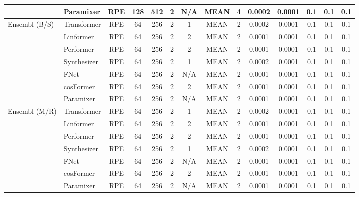 \begin{table}[!h]
{\begin{tabular}{llcccccccccccc}
                & Paramixer     & RPE & 128 & 512 & 2 & N/A & MEAN & 4 & 0.0002 & 0.0001 & 0.1 & 0.1 & 0.1 \\
\hline
Ensembl (B/S)   & Transformer   & RPE & 64 & 256 & 2 & 1 & MEAN & 2 & 0.0002 & 0.0001 & 0.1 & 0.1 & 0.1 \\
                & Linformer     & RPE & 64 & 256 & 2 & 2 & MEAN & 2 & 0.0001 & 0.0001 & 0.1 & 0.1 & 0.1 \\
                & Performer     & RPE & 64 & 256 & 2 & 2 & MEAN & 2 & 0.0001 & 0.0001 & 0.1 & 0.1 & 0.1 \\
                & Synthesizer   & RPE & 64 & 256 & 2 & 1 & MEAN & 2 & 0.0002 & 0.0001 & 0.1 & 0.1 & 0.1 \\
                & FNet          & RPE & 64 & 256 & 2 & N/A & MEAN & 2 & 0.0001 & 0.0001 & 0.1 & 0.1 & 0.1 \\
                & cosFormer     & RPE & 64 & 256 & 2 & 2 & MEAN & 2 & 0.0001 & 0.0001 & 0.1 & 0.1 & 0.1 \\
                & Paramixer     & RPE & 64 & 256 & 2 & N/A & MEAN & 2 & 0.0001 & 0.0001 & 0.1 & 0.1 & 0.1 \\
\hline
Ensembl (M/R)   & Transformer   & RPE & 64 & 256 & 2 & 1 & MEAN & 2 & 0.0002 & 0.0001 & 0.1 & 0.1 & 0.1 \\
                & Linformer     & RPE & 64 & 256 & 2 & 2 & MEAN & 2 & 0.0001 & 0.0001 & 0.1 & 0.1 & 0.1 \\
                & Performer     & RPE & 64 & 256 & 2 & 2 & MEAN & 2 & 0.0001 & 0.0001 & 0.1 & 0.1 & 0.1 \\
                & Synthesizer   & RPE & 64 & 256 & 2 & 1 & MEAN & 2 & 0.0002 & 0.0001 & 0.1 & 0.1 & 0.1 \\
                & FNet          & RPE & 64 & 256 & 2 & N/A & MEAN & 2 & 0.0001 & 0.0001 & 0.1 & 0.1 & 0.1 \\
                & cosFormer     & RPE & 64 & 256 & 2 & 2 & MEAN & 2 & 0.0001 & 0.0001 & 0.1 & 0.1 & 0.1 \\
                & Paramixer     & RPE & 64 & 256 & 2 & N/A & MEAN & 2 & 0.0001 & 0.0001 & 0.1 & 0.1 & 0.1 \\
\hline
\end{tabular}}
\end{table}



